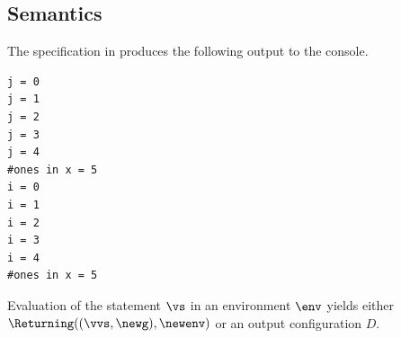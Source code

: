 \subsection{Semantics}
The specification in  produces the following output to the console.
\begin{Verbatim}[fontsize=\footnotesize, frame=single]
j = 0
j = 1
j = 2
j = 3
j = 4
#ones in x = 5
i = 0
i = 1
i = 2
i = 3
i = 4
#ones in x = 5
\end{Verbatim}

\ProseParagraph
Evaluation of the statement $\vs$ in an environment $\env$ yields
either \\ $\Returning((\vvs, \newg), \newenv)$ or an output configuration $D$.

